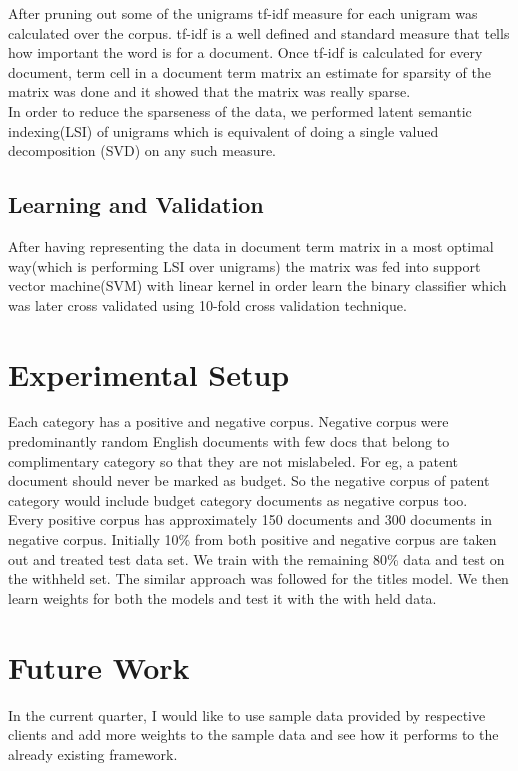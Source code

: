 \documentclass[11pt]{article}
\begin{document}
	After pruning out some of the unigrams tf-idf measure for each unigram was calculated over the corpus. tf-idf is a well defined and standard measure that tells how important the word is for a document. Once tf-idf is calculated for every document, term cell in a document term matrix an estimate for sparsity of the matrix was done and it showed that the matrix was really sparse. \\
	
	In order to reduce the sparseness of the data, we performed latent semantic indexing(LSI) of unigrams which is equivalent of doing a single valued decomposition (SVD) on any such measure.  \\
	
\subsection{Learning and Validation}
After having representing the data in document term matrix in a most optimal way(which is performing LSI over unigrams) the matrix was fed into support vector machine(SVM) with linear kernel in order learn the binary classifier which was later cross validated using 10-fold cross validation technique. \\

\section{Experimental Setup}
Each category has a positive and negative corpus. Negative corpus were predominantly random English documents with few docs that belong to complimentary category so that they are not mislabeled. For eg, a patent document should never be marked as budget. So the negative corpus of patent category would include budget category documents as negative corpus too. \\ 

Every positive corpus has approximately 150 documents and 300 documents in negative corpus. Initially 10\% from both positive and negative corpus are taken out and treated test data set. We train with the remaining 80\% data and test on the withheld set. The similar approach was followed for the titles model. We then learn weights for both the models and test it with the with held data.

\section{Future Work}

In the current quarter, I would like to use sample data provided by respective clients and add more weights to the sample data and see how it performs to the already existing framework.








 
\end{document}
